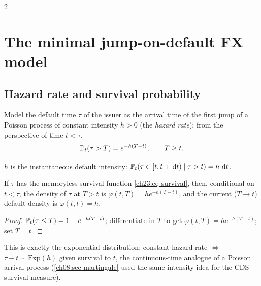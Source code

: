 \begin{paracol}{2}
\section{The minimal jump-on-default FX model}\label{ch23:sec-model}

\subsection{Hazard rate and survival probability}\label{ch23:sec-hazard}
Model the default time $\tau$ of the issuer as the arrival time of the first jump of a Poisson process of constant
intensity $h>0$ (the \emph{hazard rate}): from the perspective of time $t<\tau$,
\begin{equation}\label{ch23:eq-survival}
  \mathbb{P}_t(\tau>T)=e^{-h(T-t)},\qquad T\ge t.
\end{equation}
\begin{definition}\label{ch23:def-hazard}
$h$ is the instantaneous default intensity: $\mathbb{P}_t(\tau\in[t,t+\,\mathrm{d} t)\mid\tau>t)=h\,\,\mathrm{d} t$.
\end{definition}
\begin{proposition}\label{ch23:prop-survival}
If $\tau$ has the memoryless survival function \cref{ch23:eq-survival}, then, conditional on $t<\tau$, the density
of $\tau$ at $T>t$ is $\varphi(t,T)=he^{-h(T-t)}$, and the current (\(T\to t\)) default density is $\varphi(t,t)=h$.
\end{proposition}
\begin{proof}
$\mathbb{P}_t(\tau\le T)=1-e^{-h(T-t)}$; differentiate in $T$ to get $\varphi(t,T)=he^{-h(T-t)}$; set $T=t$.
\end{proof}
This is exactly the exponential distribution: constant hazard rate $\Leftrightarrow$ $\tau-t\sim\mathrm{Exp}(h)$ given
survival to $t$, the continuous-time analogue of a Poisson arrival process (\cref{ch08:sec-martingale} used the
same intensity idea for the CDS survival measure).


\end{paracol}
